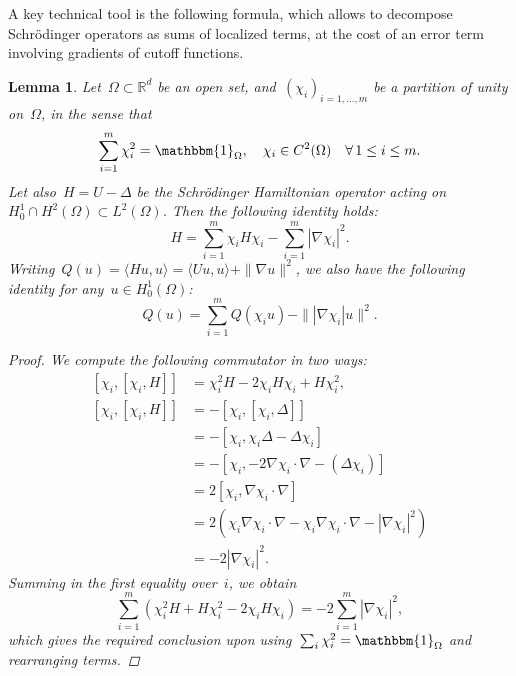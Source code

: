 \documentclass[10pt]{article}
\newcommand{\R}{\mathbb{R}}
\newcommand{\1}{\mathbbm 1}
\newtheorem{lemma}{Lemma}
\begin{document}
    A key technical tool is the following formula, which allows to decompose Schr\"odinger operators as sums of localized terms, at the cost of an error term involving gradients of cutoff functions.
    \begin{lemma}\label{lemma:ims_formula}
        Let~$\Omega \subset \R^d$ be an open set, and~$(\chi_i)_{i=1,\dots,m}$ be a partition of unity on~$\Omega$, in the sense that
        \[\sum_{i=1}^m \chi_i^2 = \mathbbm{1}_{\Omega},\quad \chi_i\in C^2(\Omega)\quad\forall\,1\leq i\leq m.\]
        Let also~$H = U-\Delta$ be the Schr\"odinger Hamiltonian operator acting on~$H_0^1\cap H^2(\Omega) \subset L^2(\Omega)$.
        Then the following identity holds:
        \begin{equation}
            \label{eq:ims_formula}
            H = \sum_{i=1}^m \chi_i H \chi_i - \sum_{i=1}^m |\nabla \chi_i|^2.
        \end{equation}
        Writing~$Q(u) = \langle Hu,u\rangle = \langle U u,u\rangle + \|\nabla u\|^2$, we also have the following identity for any~$u\in H_0^1(\Omega)$:
        \begin{equation}
            \label{eq:ims_formula_quad}
            Q(u) = \sum_{i=1}^m Q(\chi_i u) - \| |\nabla \chi_i| u\|^2.
        \end{equation}
        
        \begin{proof}
            We compute the following commutator in two ways:
            \[ \begin{aligned}
                \left[ \chi_i, [\chi_i,H]\right] &= \chi_i^2 H - 2\chi_i H \chi_i + H \chi_i^2,\\
                \left[ \chi_i, [\chi_i,H]\right]&= -\left[\chi_i , [\chi_i,\Delta]\right]\\
                &= -\left[\chi_i,\chi_i\Delta-\Delta \chi_i\right]\\
                &= -\left[\chi_i,-2\nabla\chi_i\cdot\nabla - (\Delta \chi_i)\right]\\
                &= 2\left[\chi_i,\nabla\chi_i\cdot\nabla\right]\\
                &= 2\left(\chi_i\nabla\chi_i\cdot \nabla -\chi_i\nabla\chi_i\cdot \nabla - |\nabla\chi_i|^2\right)\\
                &=-2|\nabla \chi_i|^2.
            \end{aligned} \]
            Summing in the first equality over~$i$, we obtain
            \[\sum_{i=1}^m \left(\chi_i^2 H + H\chi_i^2 -2 \chi_i H \chi_i\right) = -2 \sum_{i=1}^m |\nabla \chi_i|^2,\]
            which gives the required conclusion upon using~$\sum_i \chi_i^2 = \mathbbm{1}_\Omega$ and rearranging terms.


\end{proof}
\end{lemma}
\end{document}
